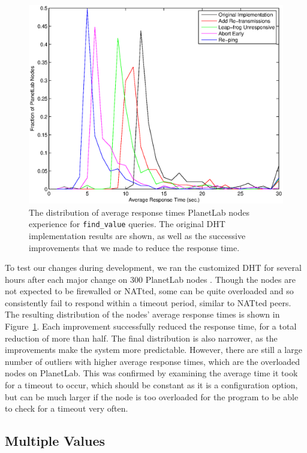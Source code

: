 \documentclass[conference]{IEEEtran}
\begin{document}
\begin{figure}
\centering
\includegraphics[width=\columnwidth]{apt_p2p_improvements-find_value.eps}
\caption{The distribution of average response times PlanetLab nodes
experience for \texttt{find\_value} queries. The original DHT
implementation results are shown, as well as the successive
improvements that we made to reduce the response time.}
\label{improvements}
\end{figure}

To test our changes during development, we ran the customized DHT
for several hours after each major change on 300 PlanetLab nodes
\cite{planetlab}. Though the nodes are not expected to be firewalled
or NATted, some can be quite overloaded and so consistently fail to
respond within a timeout period, similar to NATted peers. The
resulting distribution of the nodes' average response times is shown
in Figure~\ref{improvements}. Each improvement successfully reduced
the response time, for a total reduction of more than half. The
final distribution is also narrower, as the improvements make the
system more predictable. However, there are still a large number of
outliers with higher average response times, which are the
overloaded nodes on PlanetLab. This was confirmed by examining the
average time it took for a timeout to occur, which should be
constant as it is a configuration option, but can be much larger if
the node is too overloaded for the program to be able to check for a
timeout very often.

\subsection{Multiple Values}
\label{multiple_values}
\end{document}
